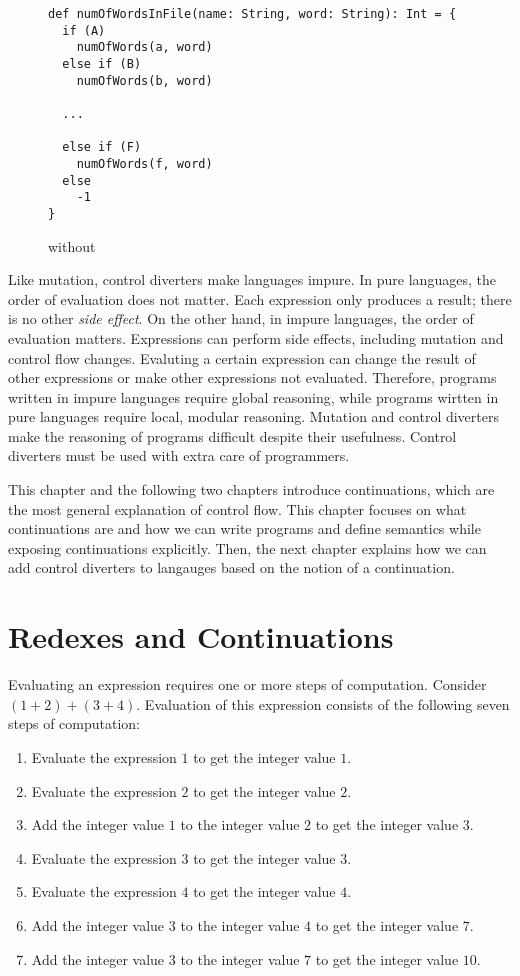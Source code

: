 \begin{figure}[t]
\begin{verbatim}
def numOfWordsInFile(name: String, word: String): Int = {
  if (A)
    numOfWords(a, word)
  else if (B)
    numOfWords(b, word)

  ...

  else if (F)
    numOfWords(f, word)
  else
    -1
}
\end{verbatim}
\caption{ without }
\end{figure}

Like mutation, control diverters make languages impure. In pure languages, the
order of evaluation does not matter. Each expression only produces a result;
there is no other \textit{side effect}.
On the other hand, in impure languages, the order
of evaluation matters. Expressions can perform side effects, including mutation
and control flow changes. Evaluting a certain expression can change the result
of other expressions or make other expressions not evaluated. Therefore,
programs written in impure languages require global reasoning, while programs
wirtten in pure languages require local, modular reasoning.
Mutation and control diverters make the reasoning of programs difficult despite
their usefulness. Control diverters must be used with extra care of programmers.

This chapter and the following two chapters introduce continuations, which are
the most general explanation of control flow. This chapter focuses on what
continuations are and how we can write programs and define semantics while
exposing continuations explicitly. Then, the next chapter explains how we can
add control diverters to langauges based on the notion of a continuation.

\section{Redexes and Continuations}

Evaluating an expression requires one or more steps of computation.
Consider $(1+2)+(3+4)$. Evaluation of this expression consists of the following
seven steps of computation:

\begin{enumerate}
  \item Evaluate the expression $1$ to get the integer value $1$.
  \item Evaluate the expression $2$ to get the integer value $2$.
  \item Add the integer value $1$ to the integer value $2$ to get the integer
    value $3$.
  \item Evaluate the expression $3$ to get the integer value $3$.
  \item Evaluate the expression $4$ to get the integer value $4$.
  \item Add the integer value $3$ to the integer value $4$ to get the integer
    value $7$.
  \item Add the integer value $3$ to the integer value $7$ to get the integer
    value $10$.
\end{enumerate}

